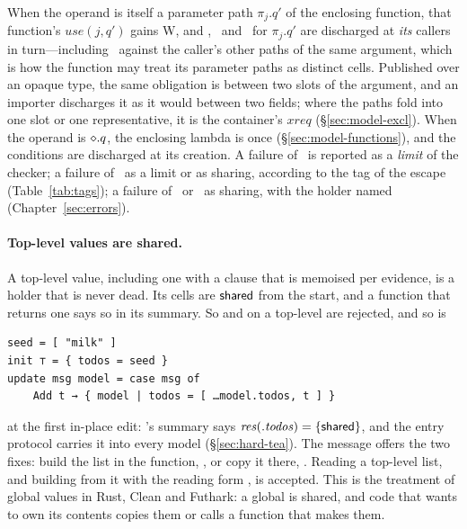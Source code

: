 When the operand is itself a parameter path $\pi_j.q'$ of the enclosing function, that function's
$\mathit{use}(j, q')$ gains \textsf{W}, and \Unescaped, \Dead\ and \Disjoint\ for $\pi_j.q'$ are
discharged at \emph{its} callers in turn---including \Disjoint\ against the caller's other paths of
the same argument, which is how the function may treat its parameter paths as distinct cells. Published
over an opaque type, the same obligation is between two slots of the argument, and an importer discharges
it as it would between two fields; where the paths fold into one slot or one representative, it is the
container's $\mathit{xreq}$ (\S\ref{sec:model-excl}). When the operand is $\diamond.q$, the enclosing lambda is once (\S\ref{sec:model-functions}), and the conditions are
discharged at its creation. A failure of \Known\ is reported as a \emph{limit} of the checker; a failure
of \Unescaped\ as a limit or as sharing, according to the tag of the escape (Table~\ref{tab:tags}); a
failure of \Dead\ or \Disjoint\ as sharing, with the holder named (Chapter~\ref{sec:errors}).

\paragraph{Top-level values are shared.} A top-level value, including one with a  clause
that is memoised per evidence, is a holder that is never dead. Its cells are $\mathsf{shared}$ from the start,
and a function that returns one says so in its summary. So  and
\code{[ x, …defaults ]} on a top-level  are rejected, and so is
\begin{Verbatim}
seed = [ "milk" ]
init ⊤ = { todos = seed }
update msg model = case msg of
    Add t → { model | todos = [ …model.todos, t ] }
\end{Verbatim}
at the first in-place edit: 's summary says $\mathit{res}(.\mathit{todos}) = \{\mathsf{shared}\}$, and
the entry protocol carries it into every model (\S\ref{sec:hard-tea}). The message offers the two fixes:
build the list in the function, , or copy it there,
. Reading a top-level list, and building from it with the reading
form , is accepted. This is the treatment of global values in Rust, Clean and
Futhark: a global is shared, and code that wants to own its contents copies them or calls a function
that makes them.

